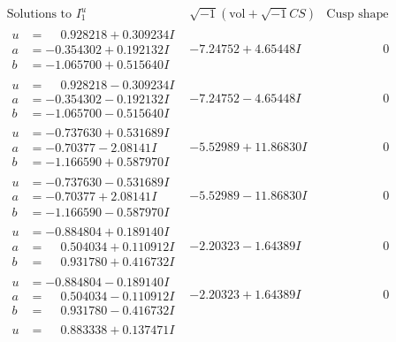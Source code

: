 \documentclass[1p]{elsarticle_modified}
\theoremstyle{definition}
\newcommand{\I}{\sqrt{-1}}
\begin{document}
$$\begin{array}{c|c|c}  
\text{Solutions to }I^u_{1}& \I (\text{vol} + \sqrt{-1}CS) & \text{Cusp shape}\\
 \hline 
\begin{aligned}
u &= \phantom{-}0.928218 + 0.309234 I \\
a &= -0.354302 + 0.192132 I \\
b &= -1.065700 + 0.515640 I\end{aligned}
 & -7.24752 + 4.65448 I & \phantom{-0.000000 } 0 \\ \hline\begin{aligned}
u &= \phantom{-}0.928218 - 0.309234 I \\
a &= -0.354302 - 0.192132 I \\
b &= -1.065700 - 0.515640 I\end{aligned}
 & -7.24752 - 4.65448 I & \phantom{-0.000000 } 0 \\ \hline\begin{aligned}
u &= -0.737630 + 0.531689 I \\
a &= -0.70377 - 2.08141 I \\
b &= -1.166590 + 0.587970 I\end{aligned}
 & -5.52989 + 11.86830 I & \phantom{-0.000000 } 0 \\ \hline\begin{aligned}
u &= -0.737630 - 0.531689 I \\
a &= -0.70377 + 2.08141 I \\
b &= -1.166590 - 0.587970 I\end{aligned}
 & -5.52989 - 11.86830 I & \phantom{-0.000000 } 0 \\ \hline\begin{aligned}
u &= -0.884804 + 0.189140 I \\
a &= \phantom{-}0.504034 + 0.110912 I \\
b &= \phantom{-}0.931780 + 0.416732 I\end{aligned}
 & -2.20323 - 1.64389 I & \phantom{-0.000000 } 0 \\ \hline\begin{aligned}
u &= -0.884804 - 0.189140 I \\
a &= \phantom{-}0.504034 - 0.110912 I \\
b &= \phantom{-}0.931780 - 0.416732 I\end{aligned}
 & -2.20323 + 1.64389 I & \phantom{-0.000000 } 0 \\ \hline\begin{aligned}
u &= \phantom{-}0.883338 + 0.137471 I \\

\end{aligned}
\end{array}$$
\end{document}
